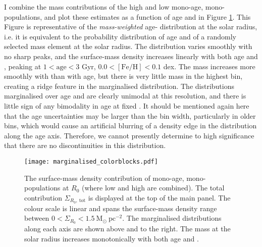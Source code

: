 I combine the mass contributions of the high and low \afe{} mono-age, mono-\feh{} populations, and plot these estimates as a function of age and \feh{} in Figure \ref{fig:margmass}. This Figure is representative of the \emph{mass-weighted} age-\feh{} distribution at the solar radius, i.e. it is equivalent to the probability distribution of age and \feh{} of a randomly selected mass element at the solar radius. The distribution varies smoothly with no sharp peaks, and the surface-mass density increases linearly with both age and \feh{}, peaking at $1 < \mathrm{age} < 3$ Gyr, $0.0 < \mathrm{[Fe/H]} < 0.1$ dex. The mass increases more smoothly with \feh{} than with age, but there is very little mass in the highest \feh{} bin, creating a ridge feature in the marginalised distribution. The distributions marginalised over age and \feh{} are clearly unimodal at this resolution, and there is little sign of any bimodality in age at fixed \feh{}. It should be mentioned again here that the age uncertainties may be larger than the bin width, particularly in older bins, which would cause an artificial blurring of a density edge in the distribution along the age axis. Therefore, we cannot presently determine to high significance that there are no discontinuities in this distribution.

\begin{figure}
 	\texttt{[image: marginalised\_colorblocks.pdf]}
 	\centering
     \caption[The surface-mass density contribution of mono-age mono-\feh{} populations at the solar radius from APOGEE DR12]{The surface-mass density contribution of mono-age, mono-\feh{} populations at $R_0$ (where low and high \afe{} are combined). The total contribution $\Sigma_{R_0,\ \mathrm{tot}}$ is displayed at the top of the main panel. The colour scale is linear and spans the surface-mass density range between $0 < \Sigma_{R_0} < 1.5\ \mathrm{M_{\odot}\ pc^{-2}}$. The marginalised distributions along each axis are shown above and to the right. The mass at the solar radius increases monotonically with both age and \feh{}. }
     \label{fig:margmass}
\end{figure}



